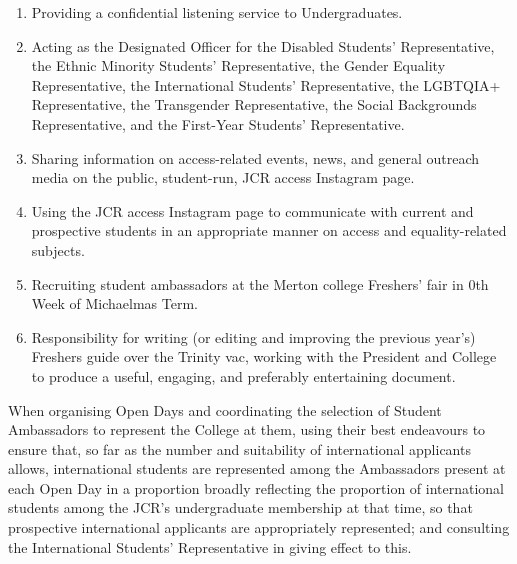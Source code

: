 \begin{enumerate}
	\item Providing a confidential listening service to Undergraduates.
	\item Acting as the Designated Officer for the Disabled Students’ Representative, the Ethnic Minority Students’ Representative, the Gender Equality Representative, the International Students’ Representative, the LGBTQIA+ Representative, the Transgender Representative, the Social Backgrounds Representative, and the First-Year Students' Representative.
	\item Sharing information on access-related events, news, and general outreach media on the public, student-run, JCR access Instagram page. 
	\item Using the JCR access Instagram page to communicate with current and prospective students in an appropriate manner on access and equality-related subjects. 
	\item Recruiting student ambassadors at the Merton college Freshers' fair in 0th Week of Michaelmas Term.
	\item \label{SC:freshers-guide} Responsibility for writing (or editing and improving the previous year's) Freshers guide over the Trinity vac, working with the President and College to produce a useful, engaging, and preferably entertaining document.
\end{enumerate}
\npara When organising Open Days and coordinating the selection of Student Ambassadors to represent the College at them, using their best endeavours to ensure that, so far as the number and suitability of international applicants allows, international students are represented among the Ambassadors present at each Open Day in a proportion broadly reflecting the proportion of international students among the JCR’s undergraduate membership at that time, so that prospective international applicants are appropriately represented; and consulting the International Students’ Representative in giving effect to this. 

